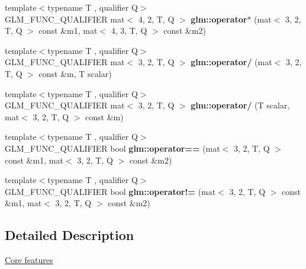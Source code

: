 \begin{DoxyCompactItemize}
\item 
\mbox{\label{type__mat3x2_8inl_aff7e9be9f5a7f1be34879ba617ea4698}} 
{\footnotesize template$<$typename T , qualifier Q$>$ }\\G\+L\+M\+\_\+\+F\+U\+N\+C\+\_\+\+Q\+U\+A\+L\+I\+F\+I\+ER mat$<$ 4, 2, T, Q $>$ {\bfseries glm\+::operator$\ast$} (mat$<$ 3, 2, T, Q $>$ const \&m1, mat$<$ 4, 3, T, Q $>$ const \&m2)
\item 
\mbox{\label{type__mat3x2_8inl_af36636be791cabfa4c7c74b5e4c34750}} 
{\footnotesize template$<$typename T , qualifier Q$>$ }\\G\+L\+M\+\_\+\+F\+U\+N\+C\+\_\+\+Q\+U\+A\+L\+I\+F\+I\+ER mat$<$ 3, 2, T, Q $>$ {\bfseries glm\+::operator/} (mat$<$ 3, 2, T, Q $>$ const \&m, T scalar)
\item 
\mbox{\label{type__mat3x2_8inl_afeb27aabe46abc6835401face3676a6e}} 
{\footnotesize template$<$typename T , qualifier Q$>$ }\\G\+L\+M\+\_\+\+F\+U\+N\+C\+\_\+\+Q\+U\+A\+L\+I\+F\+I\+ER mat$<$ 3, 2, T, Q $>$ {\bfseries glm\+::operator/} (T scalar, mat$<$ 3, 2, T, Q $>$ const \&m)
\item 
\mbox{\label{type__mat3x2_8inl_a14d8fbb4720478f04b7d69ceab4257a8}} 
{\footnotesize template$<$typename T , qualifier Q$>$ }\\G\+L\+M\+\_\+\+F\+U\+N\+C\+\_\+\+Q\+U\+A\+L\+I\+F\+I\+ER bool {\bfseries glm\+::operator==} (mat$<$ 3, 2, T, Q $>$ const \&m1, mat$<$ 3, 2, T, Q $>$ const \&m2)
\item 
\mbox{\label{type__mat3x2_8inl_a72389094ef9ca699c284e34a56573b07}} 
{\footnotesize template$<$typename T , qualifier Q$>$ }\\G\+L\+M\+\_\+\+F\+U\+N\+C\+\_\+\+Q\+U\+A\+L\+I\+F\+I\+ER bool {\bfseries glm\+::operator!=} (mat$<$ 3, 2, T, Q $>$ const \&m1, mat$<$ 3, 2, T, Q $>$ const \&m2)
\end{DoxyCompactItemize}


\subsection{Detailed Description}
\hyperlink{group__core}{Core features} 